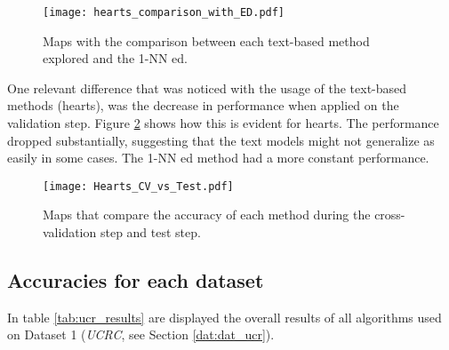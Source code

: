 \begin{figure}
\centering
\texttt{[image: hearts\_comparison\_with\_ED.pdf]}
\caption{Maps with the comparison between each text-based method explored and the 1-NN \gls{ed}.}
\label{fig:comparison_with_ed}
\end{figure}

One relevant difference that was noticed with the usage of the text-based methods (\gls{hearts}), was the decrease in performance when applied on the validation step. Figure \ref{fig:cv_vs_test} shows how this is evident for \gls{hearts}. The performance dropped substantially, suggesting that the text models might not generalize as easily in some cases. The 1-NN \gls{ed} method had a more constant performance.

\begin{figure}
\texttt{[image: Hearts\_CV\_vs\_Test.pdf]}
\caption{Maps that compare the accuracy of each method during the cross-validation step and test step.}
\label{fig:cv_vs_test}
\end{figure}


\subsection{Accuracies for each dataset}
\label{subsec:hearts_all_accuracies}

In table \ref{tab:ucr_results} are displayed the overall results of all algorithms used on Dataset 1 (\textit{UCRC}, see Section \ref{dat:dat_ucr}). 

